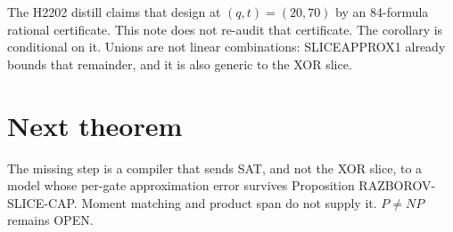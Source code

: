 \documentclass[11pt]{article}
\begin{document}
The H2202 distill claims that design at $(q,t)=(20,70)$ by an 84-formula rational certificate. This note does not re-audit that certificate. The corollary is conditional on it. Unions are not linear combinations: SLICEAPPROX1 already bounds that remainder, and it is also generic to the XOR slice.

\section{Next theorem}
The missing step is a compiler that sends SAT, and not the XOR slice, to a model whose per-gate approximation error survives Proposition RAZBOROV-SLICE-CAP. Moment matching and product span do not supply it. $P\ne NP$ remains OPEN.
\end{document}
